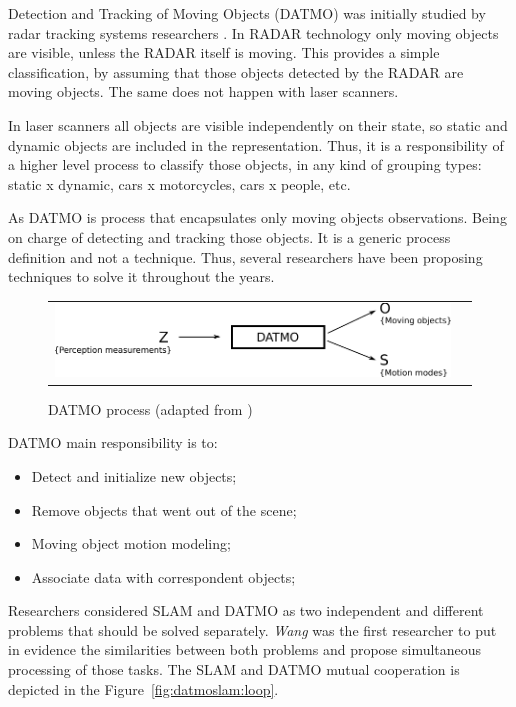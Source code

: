 Detection and Tracking of Moving Objects (DATMO) was initially studied by radar tracking systems researchers \cite{VU-2009-454238}. In RADAR technology only moving objects are visible, unless the RADAR itself is moving. This provides a simple classification, by assuming that those objects detected by the RADAR are moving objects. The same does not happen with laser scanners. 

In laser scanners all objects are visible independently on their state, so static and dynamic objects are included in the representation. Thus, it is a responsibility of a higher level process to classify those objects, in any kind of grouping types: static x dynamic, cars x motorcycles, cars x people, etc.

As DATMO is process that encapsulates only moving objects observations. Being on charge of detecting and tracking those objects. It is a generic process definition and not a technique. Thus, several researchers have been proposing techniques to solve it throughout the years.

\begin{figure}[h]
   \centering
     \begin{tabular}{lr}
       \includegraphics[scale=1.0]{img/fig:datmo:process}
     \end{tabular}
   \caption{DATMO process (adapted from \cite{Wang04a})}
   \label{fig:datmo:process}
 \end{figure}

DATMO main responsibility is to:

\begin{itemize}
\item Detect and initialize new objects;
\item Remove objects that went out of the scene;
\item Moving object motion modeling;
\item Associate data with correspondent objects;
\end{itemize}

Researchers considered SLAM and DATMO as two independent and different problems that should be solved separately. \textit{Wang} was the first researcher to put in evidence the similarities between both problems and propose simultaneous processing of those tasks\cite{Wang03onlinesimultaneous}. The SLAM and DATMO mutual cooperation is depicted in the Figure~\ref{fig:datmoslam:loop}.

